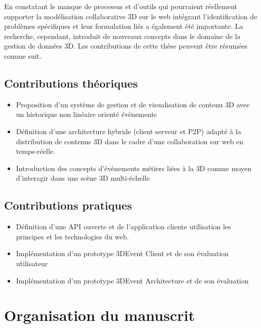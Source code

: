 En constatant le manque de processus et d'outils qui pourraient réellement supporter la modélisation collaborative \gls{3D} sur le web intégrant l'identification de problèmes spécifiques et leur formulation liés a également été importante. 
La recherche, cependant, introduit de nouveaux concepts dans le domaine de la gestion de 
données \gls{3D}. Les contributions de cette thèse peuvent être résumées comme 
suit.


\subsection{Contributions théoriques}

\begin{itemize}
	\item {}Proposition d'un système de 
	gestion et de visualisation de contenu \gls{3D} avec un historique non linéaire 
	orienté évènements
	\item Définition d'une architecture hybride (client serveur et \gls{P2P}) adapté à 
	la distribution de contenus \gls{3D} dans le cadre d'une collaboration sur web en 
	temps-réelle.
	\item Introduction des concepts d'évènements métiers liées à la \gls{3D} 
	comme moyen d'interagir dans une scène  \gls{3D} multi-échelle
\end{itemize}
\subsection{Contributions pratiques}
\begin{itemize}
	\item {}Définition d'une API ouverte et 
	de l'application cliente utilisation les principes et les technologies du web.
	\item Implémentation d'un prototype 3DEvent Client et de son évaluation 
	utilisateur 
	\item Implémentation d'un prototype 3DEvent Architecture et de son évaluation
	
\end{itemize}


\section{Organisation du manuscrit}

